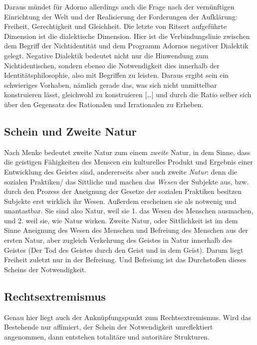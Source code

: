\documentclass[a4paper, 12pt]{scrartcl}
\begin{document}
    Daraus mündet für Adorno allerdings auch die Frage nach der vernünftigen Einrichtung der Welt und der Realisierung der Forderungen der Aufklärung: Freiheit, Gerechtigkeit und Gleichheit. 
    Die letzte von Ritsert aufgeführte Dimension ist die dialektische Dimension. Hier ist die Verbindungslinie zwischen dem Begriff der Nichtidentität und dem Programm Adornos negativer Dialektik gelegt. 
    Negative Dialektik bedeutet nicht nur die Hinwendung zum Nichtidentischen, sondern ebenso die Notwendigkeit dies innerhalb der Identitätsphilosophie, also mit Begriffen zu leisten. 
    Daraus ergibt sein ein schwieriges Vorhaben, \glqq nämlich gerade das, was sich nicht unmittelbar konstruieren lässt, gleichwohl zu konstruieren […] und durch die Ratio selber sich über den Gegensatz des Rationalen und Irrationalen zu Erheben\grqq.

    \subsection{Schein und Zweite Natur} \label{zweite-natur}
    Nach Menke bedeutet zweite Natur zum einem \textit{zweite} Natur, in dem Sinne, dass die geistigen Fähigkeiten des Menscen ein kulturelles Produkt und Ergebnis einer Entwicklung des Geistes sind, andererseits aber auch zweite \textit{Natur}: denn die sozialen Praktiken/ das Sittliche und machen das \textit{Wesen} der Subjekte aus, bzw. durch den Prozess der Aneignung der Gesetze der sozialen Praktiken besitzen Subjekte erst wirklich ihr Wesen.
    Außerdem erscheinen sie als notwenig und unantastbar. 
    Sie sind also Natur, weil sie 1. das Wesen des Menschen ausmachen, und 2. weil sie, wie Natur wirken.
    Zweite Natur, oder Sittlichkeit ist im dem Sinne Aneignung des Wesen des Menschen und Befreiung des Menschen aus der ersten Natur, aber zugleich Verkehrung des Geistes in Natur innerhalb des Geistes (Der Tod des Geistes durch den Geist und in dem Geist).
    Darum liegt Freiheit zuletzt nur in der Befreiung. Und Befreiung ist das Durchstoßen dieses Scheins der Notwendigkeit.\cite{menke:AuB}

    \subsection{Rechtsextremismus}
    Genau hier liegt auch der Anknüpfungspunkt zum Rechtsextremismus. 
    Wird das Bestehende nur affimiert, der Schein der Notwendigkeit unreflektiert angenommen, dann entstehen totalitäre und autoritäre Strukturen. 
\end{document}
